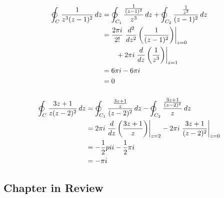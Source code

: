 \documentclass{article}
\begin{document}
\setcounter{subsubsection}{20}
\subsubsection{}

\begin{align*}
  \varointctrclockwise_C \frac{1}{z^3 (z - 1)^2} \,d z & = \varointclockwise_{C_1} \frac{\frac{1}{(z - 1)^2}}{z^3} \,d z + \varointctrclockwise_{C_2} \frac{\frac{1}{z^3}}{(z - 1)^2} \,d z \\
                                                       & = \frac{2 \pi i}{2!} \left. \frac{d^2}{d z^2} \left( \frac{1}{(z - 1)^2} \right) \right|_{z = 0}                                   \\
                                                       & \qquad + 2 \pi i \left. \frac{d}{d z} \left( \frac{1}{z^3} \right) \right|_{z = 1}                                                 \\
                                                       & = 6 \pi i - 6 \pi i                                                                                                                \\
                                                       & = 0
\end{align*}

\setcounter{subsubsection}{22}
\subsubsection{}

\begin{align*}
  \varointctrclockwise_C \frac{3 z + 1}{z (z - 2)^2} \,d z & = \varointctrclockwise_{C_1} \frac{\frac{3 z + 1}{z}}{(z - 2)^2} \,d z - \varointctrclockwise_{C_2} \frac{\frac{3 z + 1}{(z - 2)^2}}{z} \,d z \\
                                                           & = 2 \pi i \left. \frac{d}{d z} \left( \frac{3 z + 1}{z} \right) \right|_{z = 2} - 2 \pi i \left. \frac{3 z + 1}{(z - 2)^2} \right|_{z = 0}    \\
                                                           & = -\frac{1}{2} pi i - \frac{1}{2} \pi i                                                                                                       \\
                                                           & = -\pi i
\end{align*}

\subsection{Chapter in Review}
\end{document}
